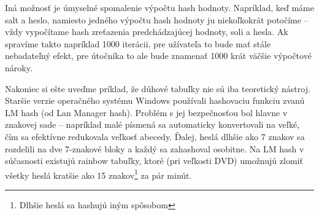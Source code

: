 Iná možnosť je úmyselné spomalenie výpočtu hash hodnoty. Napríklad,
keď máme salt a heslo, namiesto jedného výpočtu hash hodnoty ju
niekoľkokrát potočíme -- vždy vypočítame hash zreťazenia predchádzajúcej
hodnoty, soli a hesla. Ak spravíme takto napríklad 1000 iterácii, pre
užívateľa to bude mať stále nebadateľný efekt, pre útočníka to ale
bude znamenať 1000 krát väčšie výpočtové nároky.

Nakoniec si ešte uveďme príklad, že dúhové tabuľky nie sú iba
teoretický nástroj. Staršie verzie operačného systému Windows
používali hashovaciu funkciu zvanú LM hash (od Lan Manager hash).
Problém s jej bezpečnosťou bol hlavne v znakovej sade -- napríklad
malé písmená sa automaticky konvertovali na veľké, čím sa efektívne
redukovala veľkosť abecedy. Ďalej, heslá dlhšie ako 7 znakov sa
rozdelili na dve 7-znakové bloky a každý sa zahashoval osobitne.
Na LM hash v súčasnosti existujú rainbow tabuľky, ktoré (pri veľkosti
DVD) umožnujú zlomiť všetky heslá kratšie ako 15
znakov\footnote{Dlhšie heslá sa hashujú iným spôsobom} za pár minút.
